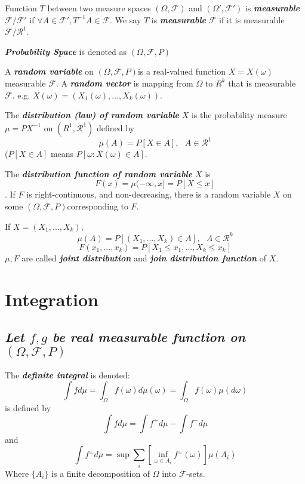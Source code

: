 \documentclass[10pt,twocolumn]{article}
\newenvironment{mydef}[1][Definition]{\begin{trivlist}
\item[\hskip \labelsep {\bfseries #1}]}{\end{trivlist}}
\newcommand{\probspace} {$(\Omega, \mathscr{F}, P)$}
\newcommand{\bt}[1]{\textbf{\textit{#1}}}
\begin{document}
\begin{mydef}
	Function $T$ between two measure spaces $(\Omega, \mathscr{F})$ and $(\Omega', \mathscr{F}')$ is \bt{measurable} $\mathscr{F}/\mathscr{F'}$ if $\forall A \in \mathscr{F}',  T^{-1}A \in \mathscr{F}$. We say $T$ is \bt{measurable} $\mathscr{F}$ if it is measurable $\mathscr{F}/\mathscr{R}^1$.
\end{mydef}

\begin{mydef}
\bt{Probability Space} is denoted as \probspace 
\end{mydef}

\begin{mydef}
 A \bt{random variable} on \probspace  is a real-valued function $X=X(\omega)$ measurable $\mathscr{F}$. A \bt{random vector} is mapping from $\Omega$ to $R^k$ that is measurable $\mathscr{F}$. e.g. $X(\omega) = (X_1(\omega),...,X_k(\omega))$.
\end{mydef}

\begin{mydef}
	The \bt{distribution (law) of random variable} $X$ is the probability measure $\mu = PX^{-1}$ on $(R^1, \mathscr{R}^1)$ defined by
	$$ \mu ( A) = P[X \in A], \ \ \ A\in \mathscr{R}^1$$ 
	($P[X\in A]$ means $P[\omega: X(\omega) \in A]$.
\end{mydef}

\begin{mydef}
	The \bt{distribution function of random variable}  $X$ is $$ F(x) = \mu (-\infty, x] = P[X \leq x]$$. If $F$ is right-continuous, and non-decreasing, there is a random variable $X$ on some \probspace  corresponding to $F$.
\end{mydef}

\begin{mydef}
	If $X = (X_1,...,X_k)$,
	$$ \mu(A) = P[(X_1, ..., X_k) \in A], \ \ \ A\in \mathscr{R}^k$$
	$$ F(x_1,...,x_k) = P[X_1\leq x_1, ... ,X_k \leq x_k]$$
	$\mu, F$ are called \bt{joint distribution} and \bt{join distribution function} of $X$.
\end{mydef}

\section*{Integration}
\subsection*{\textit{Let $f,g$ be real measurable function on \probspace}}
\begin{mydef}
	The \bt{definite integral} is denoted: $$ \int f d\mu = \int_\Omega f(\omega)d\mu (\omega) = \int_\Omega f(\omega) \mu (d\omega)$$ is defined by 
	$$\int f d\mu = \int f^+ d\mu - \int f^- d\mu$$
	and
	$$\int f^{\pm} d\mu = \sup \sum_i \left[\inf\limits_{\omega\in A_i} f^{\pm}(\omega ) \right] \mu (A_i)$$ Where $\{A_i\}$ is a finite decomposition of $\Omega$ into $\mathscr{F}$-sets.
\end{mydef}
\end{document}
